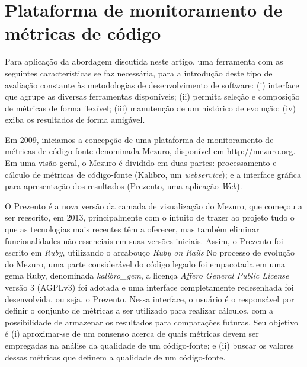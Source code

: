 \documentclass{llncs}
\begin{document}

\section{Plataforma de monitoramento de métricas de código}
\label{sec:mezuro}

Para aplicação da abordagem discutida neste artigo, uma ferramenta com as
seguintes características se faz necessária, para a introdução deste tipo de
avaliação constante às metodologias de desenvolvimento de software: (i)
interface que agrupe as diversas ferramentas disponíveis; (ii) permita seleção
e composição de métricas de forma flexível; (iii) manutenção de um histórico de
evolução; (iv) exiba os resultados de forma amigável.

Em 2009, iniciamos a concepção de uma plataforma de monitoramento de métricas
de código-fonte denominada Mezuro\cite{mezuro2012}, disponível em
{\url{http://mezuro.org}}.
%
Em uma visão geral, o Mezuro é dividido em duas partes: processamento e cálculo
de métricas de código-fonte (Kalibro, um \textit{webservice}); e a interface
gráfica para apresentação dos resultados (Prezento, uma aplicação
\textit{Web}).

O Prezento é a nova versão da camada de visualização do Mezuro, que começou a
ser reescrito, em 2013, principalmente com o intuito de trazer ao projeto tudo
o que as tecnologias mais recentes têm a oferecer, mas também eliminar
funcionalidades não essenciais em suas versões iniciais. Assim, o Prezento foi
escrito em \textit{Ruby}, utilizando o arcabouço \textit{Ruby on Rails}
%
No processo de evolução do Mezuro, uma parte considerável do código legado foi
empacotada em uma gema Ruby, denominada \textit{kalibro\_gem}, a licença
\textit{Affero General Public License} versão 3 (AGPLv3) foi adotada e uma
interface completamente redesenhada foi desenvolvida, ou seja, o Prezento.
%
Nessa interface, o usuário é o responsável por definir o conjunto de métricas a
ser utilizado para realizar cálculos, com a possibilidade de armazenar os
resultados para comparações futuras. Seu objetivo é (i) aproximar-se de um
consenso acerca de quais métricas devem ser empregadas na análise da qualidade
de um código-fonte; e (ii) buscar os valores dessas métricas que definem a
qualidade de um código-fonte.
\end{document}
